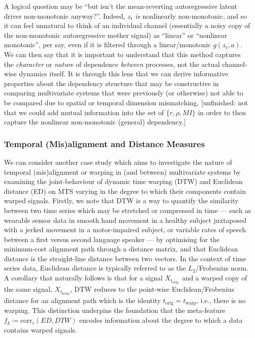 \documentclass{article}
\theoremstyle{plain}
\theoremstyle{definition}
\theoremstyle{remark}
\begin{document}
A logical question may be “but isn’t the mean-reverting autoregressive latent driver non-monotonic anyway?”. Indeed, $z_t$ \textit{is} nonlinearly non-monotonic, and so it can feel unnatural to think of an individual channel (essentially a noisy copy of the non-monotonic autoregressive mother signal) as “linear” or “nonlinear monotonic”, per say, even if it is filtered through a linear/monotonic $g(z_t, a)$. We can then say that it is important to understand that this method captures the \textit{character} or \textit{nature} of dependence \textit{between} processes, not the actual channel-wise dynamics itself. It is through this lens that we can derive informative properties about the dependency structure that may be constructive in comparing multivariate systems that were previously (or otherwise) not able to be compared due to spatial or temporal dimension mismatching. [unfinished: not that we could add mutual information into the set of $\{r, \rho, MI\}$ in order to then capture the nonlinear non-monotonic (general) dependency.]

\subsubsection{Temporal (Mis)alignment and Distance Measures}
We can consider another case study which aims to investigate the nature of temporal (mis)alignment or warping in (and between) multivariate systems by examining the joint-behaviour of dynamic time warping (DTW) and Euclidean distance (ED) on MTS varying in the degree to which their components contain warped signals. Firstly, we note that DTW is a way to quantify the similarity between two time series which may be stretched or compressed in time — such as wearable sensor data in smooth hand movement in a healthy subject juxtaposed with a jerked movement in a motor-impaired subject, or variable rates of speech between a first versus second language speaker — by optimising for the minimum-cost alignment path through a distance matrix, and that Euclidean distance is the straight-line distance between two vectors. In the context of time series data, Euclidean distance is typically referred to as the $L_2$/Frobenius norm. A corollary that naturally follows is that for a signal $X_{t_{\mathrm{orig.}}}$ and a warped copy of the same signal, $X_{t_{\mathrm{warp}}}$, DTW reduces to the point-wise Euclidean/Frobenius distance for an alignment path which is the identity $t_{\mathrm{orig}} = t_{\mathrm{warp}}$, i.e., there is no warping. This distinction underpins the foundation that the meta-feature $f_k \coloneqq \mathrm{corr}_r(ED, DTW)$ encodes information about the degree to which a data contains warped signals.
\end{document}
